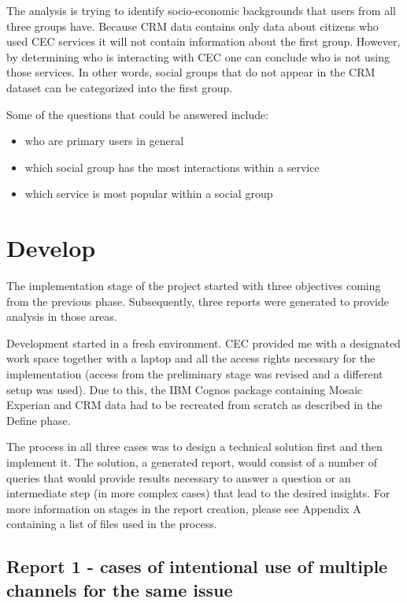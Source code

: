 The analysis is trying to identify socio-economic backgrounds that users from all three groups have. Because CRM data contains only data about citizens who used CEC services it will not contain information about the first group. However, by determining who is interacting with CEC one can conclude who is not using those services. In other words, social groups that do not appear in the CRM dataset can be categorized into the first group.

Some of the questions that could be answered include:
\begin{itemize}
\item who are primary users in general
\item which social group has the most interactions within a service
\item which service is most popular within a social group
\end{itemize}

	\section{Develop}
	
The implementation stage of the project started with three objectives coming from the previous phase. Subsequently, three reports were generated to provide analysis in those areas.

Development started in a fresh environment. CEC provided me with a designated work space together with a laptop and all the access rights necessary for the implementation (access from the preliminary stage was revised and a different setup was used). Due to this, the IBM Cognos package containing Mosaic Experian and CRM data had to be recreated from scratch as described in the Define phase.

The process in all three cases was to design a technical solution first and then implement it. The solution, a generated report, would consist of a number of queries that would provide results necessary to answer a question or an intermediate step (in more complex cases) that lead to the desired insights. For more information on stages in the report creation, please see Appendix A containing a list of files used in the process.
	
		\subsection{Report 1 - cases of intentional use of multiple channels for the same issue}
		
